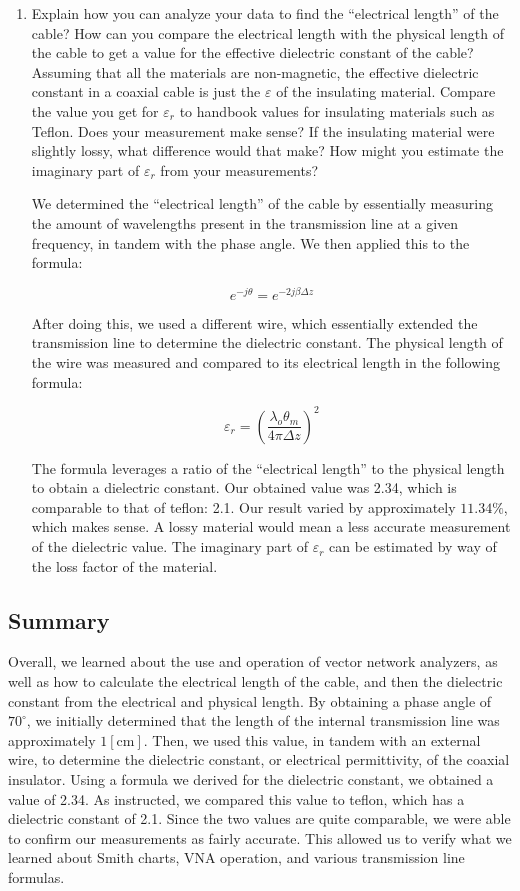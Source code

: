 \documentclass[
	letterpaper, %
	10pt, %
]{CSUniSchoolLabReport}
\begin{document}
\begin{enumerate}
  \item Explain how you can analyze your data to find the ``electrical length'' of the cable? How can you compare the electrical length with the physical length of the cable to get a value for the effective dielectric constant of the cable? Assuming that all the materials are non-magnetic, the effective dielectric constant in a coaxial cable is just the $\varepsilon$ of the insulating material. Compare the value you get for $\varepsilon_r$ to  handbook  values  for  insulating  materials  such  as  Teflon.  Does  your  measurement make sense? If the insulating material were slightly lossy, what difference would that make? How might you estimate the imaginary part of $\varepsilon_r$ from your measurements?

    We determined the ``electrical length'' of the cable by essentially measuring the amount of wavelengths present in the transmission line at a given frequency, in tandem with the phase angle. We then applied this to the formula:

    $$e^{-j\theta}=e^{-2j\beta\Delta z}$$

    After doing this, we used a different wire, which essentially extended the transmission line to determine the dielectric constant. The physical length of the wire was measured and compared to its electrical length in the following formula:

    $$\varepsilon_r=\left( \frac{\lambda_o\theta_m}{4\pi\Delta z} \right)^2$$

    The formula leverages a ratio of the ``electrical length'' to the physical length to obtain a dielectric constant. Our obtained value was 2.34, which is comparable to that of teflon: 2.1. Our result varied by approximately $11.34\%$, which makes sense. A lossy material would mean a less accurate measurement of the dielectric value. The imaginary part of $\varepsilon_r$ can be estimated by way of the loss factor of the material.

\end{enumerate}

\subsection{Summary}

Overall, we learned about the use and operation of vector network analyzers, as well as how to calculate the electrical length of the cable, and then the dielectric constant from the electrical and physical length. By obtaining a phase angle of $70^{\circ}$, we initially determined that the length of the internal transmission line was approximately $1[\si{\centi\meter}]$. Then, we used this value, in tandem with an external wire, to determine the dielectric constant, or electrical permittivity, of the coaxial insulator.
    Using a formula we derived for the dielectric constant, we obtained a value of 2.34. As instructed, we compared this value to teflon, which has a dielectric constant of 2.1. Since the two values are quite comparable, we were able to confirm our measurements as fairly accurate. This allowed us to verify what we learned about Smith charts, VNA operation, and various transmission line formulas.
\end{document}
